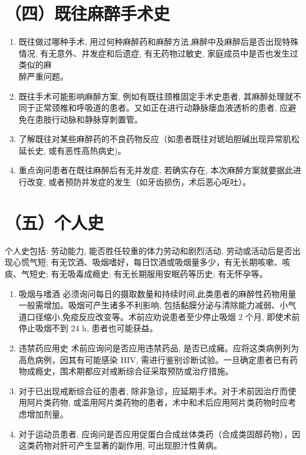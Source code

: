 \documentclass[10pt]{article}
\begin{document}
\section*{（四）既往麻醉手术史}
\begin{enumerate}
  \item 既往做过哪种手术, 用过何种麻醉药和麻醉方法,麻醉中及麻醉后是否出现特殊情况, 有无意外、并发症和后遗症, 有无药物过敏史, 家庭成员中是否也发生过类似的麻\\
醉严重问题。

  \item 既往手术可能影响麻醉方案, 例如有既往颈椎固定手术史患者, 其麻醉处理就不同于正常颈椎和呼吸道的患者。又如正在进行动静脉瘘血液透析的患者, 应避免在患肢行动脉和静脉穿刺置管。

  \item 了解既往对某些麻醉药的不良药物反应（如患者既往对琥珀胆碱出现异常肌松延长史, 或有恶性高热病史)。

  \item 重点询问患者在既往麻醉后有无并发症, 若确实存在, 本次麻醉方案就要据此进行改变, 或者预防并发症的发生（如牙齿损伤，术后恶心呕吐）。

\end{enumerate}

\section*{（五）个人史}
个人史包括: 劳动能力, 能否胜任较重的体力劳动和剧烈活动, 劳动或活动后是否出现心慌气短; 有无饮酒、吸烟嗜好，每日饮酒或吸烟量多少，有无长期咳嗽、咳痰、气短史; 有无吸毒成瘾史; 有无长期服用安眠药等历史; 有无怀孕等。

\begin{enumerate}
  \item 吸烟与嗜酒 必须询问每日的摄取数量和持续时间,此类患者的麻醉性药物用量一般需增加。吸烟可产生诸多不利影响, 包括黏膜分泌与清除能力减弱、小气道口径缩小,免疫反应改变等。术前应劝说患者至少停止吸烟 2 个月, 即使术前停止吸烟不到 24 h, 患者也可能获益。

  \item 违禁药应用史 术前应询问是否应用违禁药品, 是否已成㿈。应将这类病例列为高危病例，因其有可能感染 HIV, 需进行鉴别诊断试验。一旦确定患者已有药物成瘾史，围术期都应对戒断综合征采取预防或治疗措施。

  \item 对于已出现戒断综合征的患者, 除非急诊，应延期手术。对于术前因治疗而使用阿片类药物, 或滥用阿片类药物的患者，术中和术后应用阿片类药物时应考虑增加剂量。

  \item 对于运动员患者, 应询问是否应用促蛋白合成丝体类药（合成类固醇药物），因这类药物对肝可产生显著的副作用, 可出现胆汁性黄病。

\end{enumerate}
\end{document}
